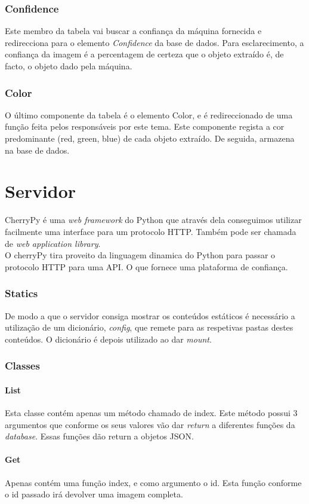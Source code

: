 \documentclass{report}
\begin{document}
\subsection{Confidence}
Este membro da tabela vai buscar a confiança da máquina fornecida e redirecciona para o elemento \textit{Confidence} da base de dados. Para esclarecimento, a confiança da imagem é a percentagem de certeza que o objeto extraído é, de facto, o objeto dado pela máquina.
\subsection{Color}
O último componente da tabela é o elemento Color, e é redireccionado de uma função feita pelos responsáveis por este tema. Este componente regista a cor predominante (red, green, blue) de cada objeto extraído. De seguida, armazena na base de dados.

\chapter{Servidor}
CherryPy é uma \textit{web framework} do Python que através dela conseguimos utilizar facilmente uma interface para um protocolo HTTP. Também pode ser chamada de \textit{web application library}.\\
O cherryPy tira proveito da linguagem dinamica do Python para passar o protocolo HTTP para uma API. O que fornece uma plataforma de confiança.

\subsection{Statics}
De modo a que o servidor consiga mostrar os conteúdos estáticos é necessário a utilização de um dicionário, \textit{config}, que remete para as respetivas pastas destes conteúdos. O dicionário é depois utilizado ao dar \textit{mount}.

\subsection{Classes}
\subsubsection{List}
Esta classe contém apenas um método chamado de index. Este método possui 3 argumentos que conforme os seus valores vão dar \textit{return} a diferentes funções da \textit{database}.
Essas funções dão return a objetos JSON.
\subsubsection{Get}
Apenas contém uma função index, e como argumento o id. Esta função conforme o id passado irá devolver uma imagem completa.
\end{document}
